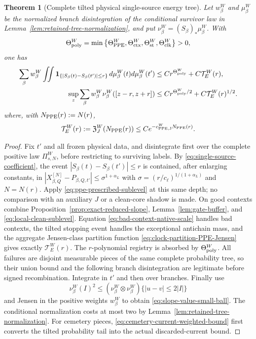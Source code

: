\documentclass[11pt]{article}
\newtheorem{theorem}{Theorem}[section]
\begin{document}
\begin{theorem}[Complete tilted physical single-source energy tree]
\label{thm:direct-slope-small-ball}
Let $w_\beta^{W}$ and $\mu_\beta^{W}$ be the normalized branch
disintegration of the conditional survivor law in
Lemma~\ref{lem:retained-tree-normalization}, and put
$\nu_\beta^{W}=(S_\beta)_*\mu_\beta^{W}$.  With
\begin{equation}
\label{eq:physical-energy-exponent}
 \Theta_{\rm poly}^{W}=\min\left\{\Theta_{\rm PPE}^{W},
        \Theta_{\rm ctx}^{W},\Theta_{\rm st}^{W},
        \Theta_{\rm clk}^{W}\right\}>0,
\end{equation}
one has
\begin{align}
 \sum_\beta w_\beta^{W}\iint
   \mathbf 1_{\{|S_\beta(t)-S_\beta(t')|\le r\}}
   \,d\mu_\beta^{W}(t)d\mu_\beta^{W}(t')
 &\le Cr^{\Theta_{\rm poly}^{W}}+C\mathcal T_E^{W}(r),\label{eq:conditional-energy-bound}\\
 \sup_z\sum_\beta w_\beta^{W}\nu_\beta^{W}([z-r,z+r])
 &\le Cr^{\Theta_{\rm poly}^{W}/2}+C\mathcal T_E^{W}(r)^{1/2}.
 \label{eq:slope-value-small-ball}
\end{align}
where, with $N_{\rm PPE}(r):=N(r)$,
\begin{equation}
\label{eq:complete-energy-tail}
 \mathcal T_E^{W}(r):=
 \mathfrak Z_J^W(N_{\rm PPE}(r))
 \le Ce^{-c_{\rm PPE,J}^{W}N_{\rm PPE}(r)}.
\end{equation}
\end{theorem}

\begin{proof}
Fix $t'$ and all frozen physical data, and disintegrate first over the
complete positive law $\Pi_{s,N}^{W}$, before restricting to surviving
labels.  By
\eqref{eq:single-source-coefficient}, the event
$|S_\beta(t)-S_\beta(t')|\le r$ is contained, after enlarging constants, in
 $|X^{[N]}_{\beta,Q}-P_{\beta,Q,t'}|\le\sigma^{1+\alpha_L}$ with
$\sigma=(r/c_\ell)^{1/(1+\alpha_L)}$ and $N=N(r)$.  Apply
\eqref{eq:ppe-prescribed-sublevel} at this same depth; no comparison with an
auxiliary $J$ or a clean-core shadow is made.  On good contexts combine
Proposition~\ref{prop:exact-reduced-slope}, Lemma~\ref{lem:gate-buffer}, and
\eqref{eq:local-clean-sublevel}.  Equation \eqref{eq:bad-context-native-scale}
handles bad contexts, the tilted stopping event handles the exceptional
antichain mass, and the aggregate Jensen-class partition function
\eqref{eq:clock-partition-PPE-Jensen} gives exactly
$\mathcal T_E^{W}(r)$.  The
$r$-polynomial registry is absorbed by $\Theta_{\rm poly}^{W}$.  All
failures are disjoint measurable pieces of the
same complete probability tree, so their union bound and the following
branch disintegration are legitimate before signed recombination.  Integrate
in $t'$ and then over branches.  Finally use
\[
 \nu_\beta^{W}(I)^2\le
 (\nu_\beta^{W}\otimes\nu_\beta^{W})\{|u-v|\le2|I|\}
\]
and Jensen in the positive weights $w_\beta^{W}$ to obtain
\eqref{eq:slope-value-small-ball}.
The conditional normalization costs at most two by
Lemma~\ref{lem:retained-tree-normalization}.  For cemetery pieces,
\eqref{eq:cemetery-current-weighted-bound} first converts the tilted
probability tail into the actual discarded-current bound.
\end{proof}
\end{document}
